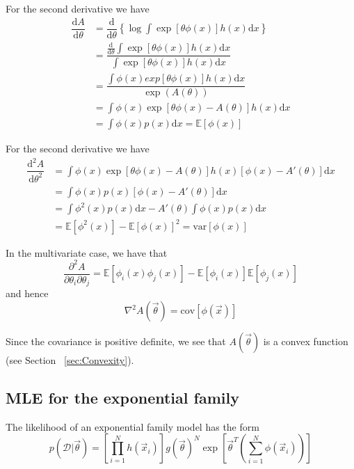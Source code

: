 For the second derivative we have
\begin{align}
\dfrac{\mathrm{d} A}{\mathrm{d} \theta} & = \dfrac{\mathrm{d}}{\mathrm{d} \theta}\left\{\log\int\exp\left[\theta\phi(x)\right]h(x)\mathrm{d}x\right\} \nonumber \\
    & = \dfrac{\frac{\mathrm{d}}{\mathrm{d} \theta}\int\exp\left[\theta\phi(x)\right]h(x)\mathrm{d}x}{\int\exp\left[\theta\phi(x)\right]h(x)\mathrm{d}x} \nonumber \\
	& = \dfrac{\int\phi(x)exp\left[\theta\phi(x)\right]h(x)\mathrm{d}x}{\exp(A(\theta))} \nonumber \\
	& = \int \phi(x)\exp\left[\theta\phi(x)-A(\theta)\right]h(x)\mathrm{d}x \nonumber \\
	& = \int \phi(x)p(x)\mathrm{d}x=\mathbb{E}[\phi(x)]
\end{align}

For the second derivative we have
\begin{align}
\dfrac{\mathrm{d}^2 A}{\mathrm{d} \theta^2} & = \int \phi(x)\exp\left[\theta\phi(x)-A(\theta)\right]h(x)\left[\phi(x)-A'(\theta)\right]\mathrm{d}x \nonumber \\
    & = \int \phi(x)p(x)\left[\phi(x)-A'(\theta)\right]\mathrm{d}x \nonumber \\
	& = \int \phi^2(x)p(x)\mathrm{d}x-A'(\theta)\int \phi(x)p(x)\mathrm{d}x \nonumber \\
	& = \mathbb{E}[\phi^2(x)]-\mathbb{E}[\phi(x)]^2=\mathrm{var}[\phi(x)]
\end{align}

In the multivariate case, we have that
\begin{equation}
\dfrac{\partial^2 A}{\partial \theta_i \partial \theta_j}=\mathbb{E}[\phi_i(x)\phi_j(x)]-\mathbb{E}[\phi_i(x)]\mathbb{E}[\phi_j(x)]
\end{equation}
and hence
\begin{equation}
\nabla^2A(\vec{\theta}) = \mathrm{cov}[\phi(\vec{x})]
\end{equation}

Since the covariance is positive definite, we see that $A(\vec{\theta})$ is a convex function (see Section ~\ref{sec:Convexity}).


\subsection{MLE for the exponential family}
The likelihood of an exponential family model has the form
\begin{equation}
p(\mathcal{D}|\vec{\theta})=\left[\prod\limits_{i=1}^N h(\vec{x}_i)\right]g(\vec{\theta})^N\exp\left[\vec{\theta}^T\left(\sum\limits_{i=1}^N \phi(\vec{x}_i)\right)\right]
\end{equation}

